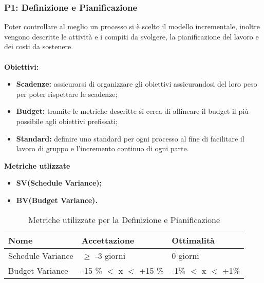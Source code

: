 \subsubsection{P1: Definizione e Pianificazione}
Poter controllare al meglio un processo si è scelto il modello incrementale, inoltre vengono descritte le attività e i compiti da svolgere, la pianificazione del lavoro e dei costi da sostenere. \\\\
\textbf{Obiettivi:}
\begin{itemize}
		\item{\textbf{Scadenze:} assicurarsi di organizzare gli obiettivi assicurandosi del loro peso per poter rispettare le scadenze;}
		\item{\textbf{Budget:} tramite le metriche descritte si cerca di allineare il budget il più possibile agli obiettivi prefissati;}
		\item \textbf{Standard:} definire uno standard per ogni processo al fine di facilitare il lavoro di gruppo e l'incremento continuo di ogni parte.\\
\end{itemize} 
\textbf{Metriche utlizzate}
\begin{itemize}
	\item{\textbf{SV(Schedule Variance);}}
	\item{\textbf{BV(Budget Variance).}}
\end{itemize}
\begin{table}[!htpb]
	\centering
	\renewcommand{\arraystretch}{2} 
	\begin{tabular}{|l|l|l|}
		\hline
		\rowcolor{orange!50} 
		\textbf{Nome} & \textbf{Accettazione} & \textbf{Ottimalità} \\
		\hline
		Schedule Variance & $\geq$ -3 giorni &0 giorni \\
		\hline
		Budget Variance & -15 \% $<$ x $<$ +15 \% & -1\% $<$ x $<$ +1\% \\ 
		\hline
	\end{tabular}
	\caption{Metriche utilizzate per la Definizione e Pianificazione}
\end{table}
\newpage
